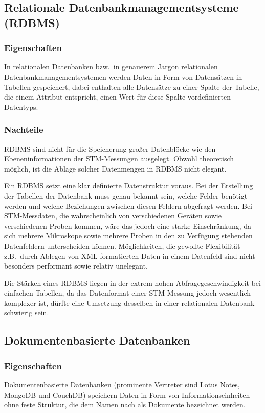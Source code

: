 \documentclass[12pt,ngerman,a4]{scrartcl}
\newcommand{\pquote}[1]{\glqq #1\grqq}
\begin{document}
\subsection{Relationale Datenbankmanagementsysteme (RDBMS)}
\subsubsection{Eigenschaften}
In relationalen Datenbanken bzw.\ in genauerem Jargon relationalen Datenbankmanagementsystemen werden Daten in Form von Datensätzen in Tabellen gespeichert, dabei enthalten alle Datensätze zu einer \pquote{Spalte} der Tabelle, die einem Attribut entspricht, einen Wert für diese Spalte vordefinierten Datentyps.
\subsubsection{Nachteile}
RDBMS sind nicht für die Speicherung großer Datenblöcke wie den Ebeneninformationen der STM-Messungen ausgelegt. Obwohl theoretisch möglich, ist die Ablage solcher Datenmengen in RDBMS nicht elegant.

Ein RDBMS setzt eine klar definierte Datenstruktur voraus. Bei der Erstellung der Tabellen der Datenbank muss genau bekannt sein, welche Felder benötigt werden und welche Beziehungen zwischen diesen Feldern abgefragt werden. Bei STM-Messdaten, die wahrscheinlich von verschiedenen Geräten sowie verschiedenen Proben kommen, wäre das jedoch eine starke Einschränkung, da sich mehrere Mikroskope sowie mehrere Proben in den zu Verfügung stehenden Datenfeldern unterscheiden können. Möglichkeiten, die gewollte Flexibilität z.B.\ durch Ablegen von XML-formatierten Daten in einem Datenfeld sind nicht besonders performant sowie relativ unelegant.

Die Stärken eines RDBMS liegen in der extrem hohen Abfragegeschwindigkeit bei einfachen Tabellen, da das Datenformat einer STM-Messung jedoch wesentlich komplexer ist, dürfte eine Umsetzung desselben in einer relationalen Datenbank schwierig sein.
\subsection{Dokumentenbasierte Datenbanken}
\subsubsection{Eigenschaften}
Dokumentenbasierte Datenbanken (prominente Vertreter sind Lotus Notes, MongoDB und CouchDB) speichern Daten in Form von Informationseinheiten ohne feste Struktur, die dem Namen nach als Dokumente bezeichnet werden.
\end{document}
